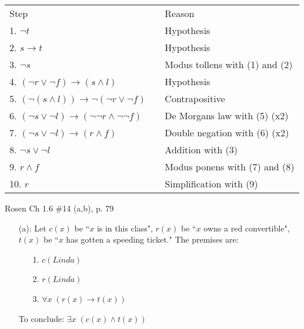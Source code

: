 \documentclass[12pt,addpoints]{exam}
\begin{document}
\begin{questions}
\begin{solution}
    \begin{tabular}{lll}
        Step    & \hspace{0.2in} & Reason \\
        1. $\neg t$                 &       & Hypothesis \\
        2. $s \rightarrow t$        &       & Hypothesis \\
        3. $\neg s$                 &       & Modus tollens with (1) and (2) \\
        4. $(\neg r \vee \neg f) \rightarrow (s \wedge l)$  &   & Hypothesis \\
        5. $(\neg(s \wedge l)) \rightarrow \neg(\neg r \vee \neg f)$    & & Contrapositive \\
        6. $(\neg s \vee \neg l) \rightarrow (\neg \neg r \wedge \neg \neg f)$ & & De Morgans law with (5) (x2) \\
        7. $(\neg s \vee \neg l) \rightarrow (r \wedge f)$  & & Double negation with (6) (x2) \\
        8. $\neg s \vee \neg l$     &       & Addition with (3) \\
        9. $r \wedge f$             &       & Modus ponens with (7) and (8) \\
        10. $r$                     &       & Simplification with (9)
    \end{tabular}
\end{solution}


\question Rosen Ch 1.6 \#14 (a,b), p. 79
    \ifprintanswers
        \vspace{-10pt}
    \fi
\begin{solution}
    \begin{itemize}[itemsep=0pt,parsep=0pt,topsep=0pt,partopsep=0pt]
    \item[(a):] Let $c(x)$ be ``$x$ is in this class", $r(x)$ be ``$x$ owns a red convertible", $t(x)$ be ``$x$ has gotten a speeding ticket."  The premises are:
    \begin{itemize}[itemsep=0pt,parsep=0pt,topsep=0pt,partopsep=0pt]
        \item[1.] $c(Linda)$
        \item[2.] $r(Linda)$
        \item[3.] $\forall x\; (r(x) \rightarrow t(x))$
    \end{itemize}
    To conclude: $\exists x\; (c(x) \wedge t(x))$


\end{itemize}
\end{solution}
\end{questions}
\end{document}
